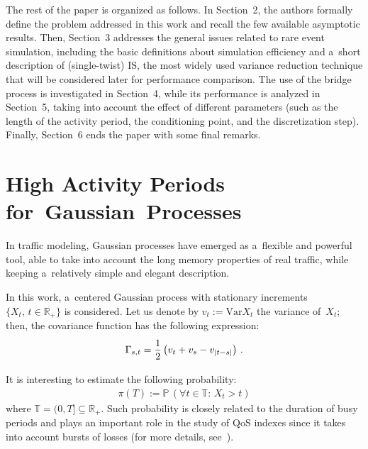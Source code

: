 \begin{multicols}{2}
The rest of the paper is organized as follows. In Section~2,
 the authors formally define the problem addressed in this work and recall the few available 
 asymptotic results.
Then, Section~3 addresses the general issues related to rare event 
simulation, including the basic definitions about simulation efficiency and a~short 
description of (single-twist) IS, the most widely used variance 
reduction technique that will be considered later for performance comparison.
The use of the bridge process is investigated in Section~4, while its 
performance is analyzed in Section~5, taking into account the effect 
of different parameters (such as the length of the activity period, the conditioning 
point, and the discretization step). Finally, Section~6 ends the paper 
with some final remarks.

\vspace*{-4pt}

\section{High Activity Periods for~Gaussian~Processes}

\vspace*{-2pt}

\noindent
In traffic modeling, Gaussian processes have emerged as a~flexible and powerful tool, 
able to take into account the long memory properties of real traffic, while keeping 
a~relatively simple and elegant description.


In this work,  a~centered Gaussian process with stationary increments
$\{X_t,\,t \in \mathbb{R}_+\}$ is considered. Let us denote by 
$v_t :=\mathrm{Var} X_t$ the variance of~$X_t$; then,
the covariance function has the following expression:
\begin{equation*}
\Gamma_{s,t}  =  \displaystyle\frac{\displaystyle 1\mathstrut}{\displaystyle 2\mathstrut} \left( v_t+v_s-v_{|t-s|} \right)\,.
\end{equation*}

It is interesting to estimate the following probability:
\begin{eqnarray}
\pi (T)  :=  \mathbb{P} \, (\forall t \in \mathbb{T}:\, X_t >t)
\label{e1-luk}
\end{eqnarray}
where $\mathbb{T}=(0,T] \subseteq \mathbb{R}_+ $. Such probability is closely related 
to the duration of busy periods and plays an important role in the study 
of QoS indexes since it takes into account bursts of losses (for more details,
see~\cite{Norros, Mandjes}).


\end{multicols}
